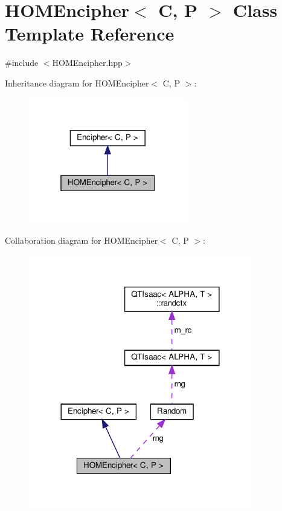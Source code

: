 \hypertarget{classHOMEncipher}{}\section{H\+O\+M\+Encipher$<$ C, P $>$ Class Template Reference}
\label{classHOMEncipher}


{\ttfamily \#include $<$H\+O\+M\+Encipher.\+hpp$>$}



Inheritance diagram for H\+O\+M\+Encipher$<$ C, P $>$\+:\nopagebreak
\begin{figure}[H]
\begin{center}
\leavevmode
\includegraphics[width=196pt]{classHOMEncipher__inherit__graph}
\end{center}
\end{figure}


Collaboration diagram for H\+O\+M\+Encipher$<$ C, P $>$\+:\nopagebreak
\begin{figure}[H]
\begin{center}
\leavevmode
\includegraphics[width=276pt]{classHOMEncipher__coll__graph}
\end{center}
\end{figure}
